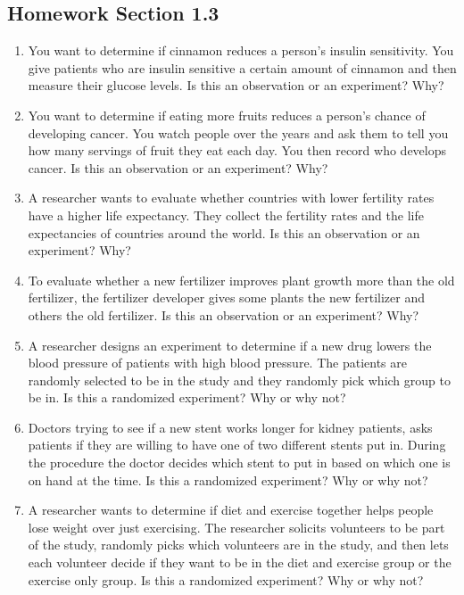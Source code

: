 \documentclass[
]{book}
\begin{document}
\hypertarget{homework-section-1.3}{%
\subsection{Homework Section 1.3}\label{homework-section-1.3}}

\begin{enumerate}
\def\labelenumi{\arabic{enumi}.}
\item
  You want to determine if cinnamon reduces a person's insulin sensitivity. You give patients who are insulin sensitive a certain amount of cinnamon and then measure their glucose levels. Is this an observation or an experiment? Why?
\item
  You want to determine if eating more fruits reduces a person's chance of developing cancer. You watch people over the years and ask them to tell you how many servings of fruit they eat each day. You then record who develops cancer. Is this an observation or an experiment? Why?
\item
  A researcher wants to evaluate whether countries with lower fertility rates have a higher life expectancy. They collect the fertility rates and the life expectancies of countries around the world. Is this an observation or an experiment? Why?
\item
  To evaluate whether a new fertilizer improves plant growth more than the old fertilizer, the fertilizer developer gives some plants the new fertilizer and others the old fertilizer. Is this an observation or an experiment? Why?
\item
  A researcher designs an experiment to determine if a new drug lowers the blood pressure of patients with high blood pressure. The patients are randomly selected to be in the study and they randomly pick which group to be in. Is this a randomized experiment? Why or why not?
\item
  Doctors trying to see if a new stent works longer for kidney patients, asks patients if they are willing to have one of two different stents put in. During the procedure the doctor decides which stent to put in based on which one is on hand at the time. Is this a randomized experiment? Why or why not?
\item
  A researcher wants to determine if diet and exercise together helps people lose weight over just exercising. The researcher solicits volunteers to be part of the study, randomly picks which volunteers are in the study, and then lets each volunteer decide if they want to be in the diet and exercise group or the exercise only group. Is this a randomized experiment? Why or why not?

\end{enumerate}
\end{document}
